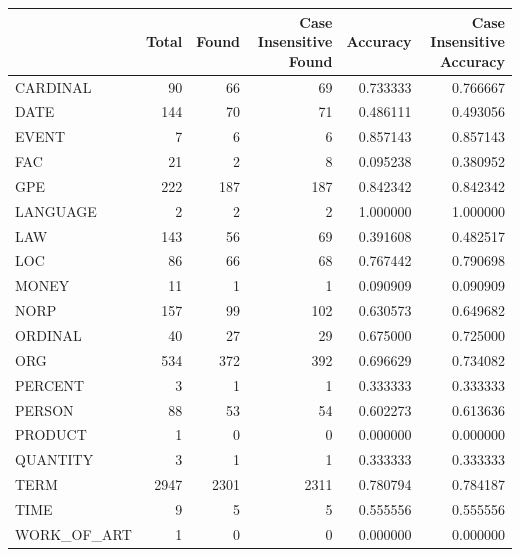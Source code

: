\begin{tabular}{lrrrrr}
\toprule
 & Total & Found & Case Insensitive Found & Accuracy & Case Insensitive Accuracy \\
\midrule
CARDINAL & 90 & 66 & 69 & 0.733333 & 0.766667 \\
DATE & 144 & 70 & 71 & 0.486111 & 0.493056 \\
EVENT & 7 & 6 & 6 & 0.857143 & 0.857143 \\
FAC & 21 & 2 & 8 & 0.095238 & 0.380952 \\
GPE & 222 & 187 & 187 & 0.842342 & 0.842342 \\
LANGUAGE & 2 & 2 & 2 & 1.000000 & 1.000000 \\
LAW & 143 & 56 & 69 & 0.391608 & 0.482517 \\
LOC & 86 & 66 & 68 & 0.767442 & 0.790698 \\
MONEY & 11 & 1 & 1 & 0.090909 & 0.090909 \\
NORP & 157 & 99 & 102 & 0.630573 & 0.649682 \\
ORDINAL & 40 & 27 & 29 & 0.675000 & 0.725000 \\
ORG & 534 & 372 & 392 & 0.696629 & 0.734082 \\
PERCENT & 3 & 1 & 1 & 0.333333 & 0.333333 \\
PERSON & 88 & 53 & 54 & 0.602273 & 0.613636 \\
PRODUCT & 1 & 0 & 0 & 0.000000 & 0.000000 \\
QUANTITY & 3 & 1 & 1 & 0.333333 & 0.333333 \\
TERM & 2947 & 2301 & 2311 & 0.780794 & 0.784187 \\
TIME & 9 & 5 & 5 & 0.555556 & 0.555556 \\
WORK_OF_ART & 1 & 0 & 0 & 0.000000 & 0.000000 \\
\bottomrule
\end{tabular}
